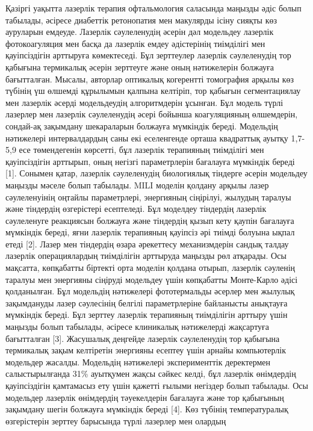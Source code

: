 Қазіргі уақытта лазерлік терапия офтальмология саласында маңызды әдіс
болып табылады, әсіресе диабеттік ретонопатия мен макулярды ісіну сияқты
көз ауруларын емдеуде. Лазерлік сәулеленудің әсерін дәл модельдеу
лазерлік фотокоагуляция мен басқа да лазерлік емдеу әдістерінің
тиімділігі мен қауіпсіздігін арттыруға көмектеседі. Бұл зерттеулер
лазерлік сәулеленудің тор қабығына термикалық әсерін зерттеуге және оның
нәтижелерін болжауға бағытталған. Мысалы, авторлар оптикалық когерентті
томография арқылы көз түбінің үш өлшемді құрылымын қалпына келтіріп, тор
қабығын сегментациялау мен лазерлік әсерді модельдеудің алгоритмдерін
ұсынған. Бұл модель түрлі лазерлер мен лазерлік сәулеленудің әсері
бойынша коагуляцияның өлшемдерін, сондай-ақ зақымдану шекараларын
болжауға мүмкіндік береді. Модельдің нәтижелері интервалдардың саны екі
еселенгенде орташа квадраттық ауытқу 1,7-5,9 есе төмендегенін көрсетті,
бұл лазерлік терапияның тиімділігі мен қауіпсіздігін арттырып, оның
негізгі параметрлерін бағалауға мүмкіндік береді {[}1{]}. Сонымен қатар,
лазерлік сәулеленудің биологиялық тіндерге әсерін модельдеу маңызды
мәселе болып табылады. MILI моделін қолдану арқылы лазер сәулеленуінің
оңтайлы параметрлері, энергияның сіңірілуі, жылудың таралуы және
тіндердің өзгерістері есептеледі. Бұл моделдеу тіндердің лазерлік
сәулеленуге реакциясын болжауға және тіндердің қызып кету қаупін
бағалауға мүмкіндік береді, яғни лазерлік терапияның қауіпсіз әрі тиімді
болуына ықпал етеді {[}2{]}. Лазер мен тіндердің өзара әрекеттесу
механизмдерін сандық талдау лазерлік операциялардың тиімділігін
арттыруда маңызды рөл атқарады. Осы мақсатта, көпқабатты біртекті орта
моделін қолдана отырып, лазерлік сәуленің таралуы мен энергияны сіңіруді
модельдеу үшін көпқабатты Монте-Карло әдісі қолданылған. Бұл модельдің
нәтижелері фототермальды әсерлер мен жылулық зақымдануды лазер
сәулесінің белгілі параметрлеріне байланысты анықтауға мүмкіндік береді.
Бұл зерттеу лазерлік терапияның тиімділігін арттыру үшін маңызды болып
табылады, әсіресе клиникалық нәтижелерді жақсартуға бағытталған {[}3{]}.
Жасушалық деңгейде лазерлік сәулеленудің тор қабығына термикалық зақым
келтіретін энергияны есептеу үшін арнайы компьютерлік модельдер жасалды.
Модельдің нәтижелері эксперименттік деректермен салыстырылғанда 31\%
ауытқумен жақсы сәйкес келді, бұл лазерлік өнімдердің қауіпсіздігін
қамтамасыз ету үшін қажетті ғылыми негіздер болып табылады. Осы
модельдер лазерлік өнімдердің тәуекелдерін бағалауға және тор қабығының
зақымдану шегін болжауға мүмкіндік береді {[}4{]}. Көз түбінің
температуралық өзгерістерін зерттеу барысында түрлі лазерлер мен олардың
